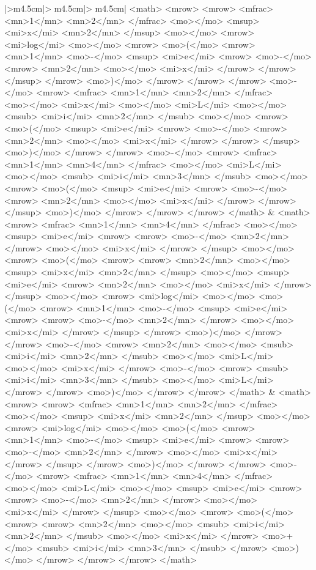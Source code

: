 \begin{longtable}{|>{\centering\arraybackslash}m{4.5cm}|>
{\centering\arraybackslash}m{4.5cm}|>
{\centering\arraybackslash}m{4.5cm}|}
\scriptsize{\codefont <math> <mrow> <mrow> <mfrac> <mn>1</mn> <mn>2</mn> </mfrac> <mo>⁢</mo> <msup> <mi>x</mi> <mn>2</mn> </msup> <mo>⁢</mo> <mrow> <mi>log</mi> <mo>⁡</mo> <mrow> <mo>(</mo> <mrow> <mn>1</mn> <mo>-</mo> <msup> <mi>e</mi> <mrow> <mo>-</mo> <mrow> <mn>2</mn> <mo>⁢</mo> <mi>x</mi> </mrow> </mrow> </msup> </mrow> <mo>)</mo> </mrow> </mrow> </mrow> <mo>-</mo> <mrow> <mfrac> <mn>1</mn> <mn>2</mn> </mfrac> <mo>⁢</mo> <mi>x</mi> <mo>⁢</mo> <mi>L</mi> <mo>⁢</mo> <msub> <mi>i</mi> <mn>2</mn> </msub> <mo>⁢</mo> <mrow> <mo>(</mo> <msup> <mi>e</mi> <mrow> <mo>-</mo> <mrow> <mn>2</mn> <mo>⁢</mo> <mi>x</mi> </mrow> </mrow> </msup> <mo>)</mo> </mrow> </mrow> <mo>-</mo> <mrow> <mfrac> <mn>1</mn> <mn>4</mn> </mfrac> <mo>⁢</mo> <mi>L</mi> <mo>⁢</mo> <msub> <mi>i</mi> <mn>3</mn> </msub> <mo>⁢</mo> <mrow> <mo>(</mo> <msup> <mi>e</mi> <mrow> <mo>-</mo> <mrow> <mn>2</mn> <mo>⁢</mo> <mi>x</mi> </mrow> </mrow> </msup> <mo>)</mo> </mrow> </mrow> </mrow> </math> }      & \scriptsize{\codefont <math> <mrow> <mfrac> <mn>1</mn> <mn>4</mn> </mfrac> <mo>⁢</mo> <msup> <mi>e</mi> <mrow> <mrow> <mo>-</mo> <mn>2</mn> </mrow> <mo>⁢</mo> <mi>x</mi> </mrow> </msup> <mo>⁢</mo> <mrow> <mo>(</mo> <mrow> <mrow> <mn>2</mn> <mo>⁢</mo> <msup> <mi>x</mi> <mn>2</mn> </msup> <mo>⁢</mo> <msup> <mi>e</mi> <mrow> <mn>2</mn> <mo>⁢</mo> <mi>x</mi> </mrow> </msup> <mo>⁢</mo> <mrow> <mi>log</mi> <mo>⁡</mo> <mo>(</mo> <mrow> <mn>1</mn> <mo>-</mo> <msup> <mi>e</mi> <mrow> <mrow> <mo>-</mo> <mn>2</mn> </mrow> <mo>⁢</mo> <mi>x</mi> </mrow> </msup> </mrow> <mo>)</mo> </mrow> </mrow> <mo>-</mo> <mrow> <mn>2</mn> <mo>⁢</mo> <msub> <mi>i</mi> <mn>2</mn> </msub> <mo>⁢</mo> <mi>L</mi> <mo>⁢</mo> <mi>x</mi> </mrow> <mo>-</mo> <mrow> <msub> <mi>i</mi> <mn>3</mn> </msub> <mo>⁢</mo> <mi>L</mi> </mrow> </mrow> <mo>)</mo> </mrow> </mrow> </math> }    & \scriptsize{\codefont <math> <mrow> <mrow> <mfrac> <mn>1</mn> <mn>2</mn> </mfrac> <mo>⁢</mo> <msup> <mi>x</mi> <mn>2</mn> </msup> <mo>⁢</mo> <mrow> <mi>log</mi> <mo>⁡</mo> <mo>(</mo> <mrow> <mn>1</mn> <mo>-</mo> <msup> <mi>e</mi> <mrow> <mrow> <mo>-</mo> <mn>2</mn> </mrow> <mo>⁢</mo> <mi>x</mi> </mrow> </msup> </mrow> <mo>)</mo> </mrow> </mrow> <mo>-</mo> <mrow> <mfrac> <mn>1</mn> <mn>4</mn> </mfrac> <mo>⁢</mo> <mi>L</mi> <mo>⁢</mo> <msup> <mi>e</mi> <mrow> <mrow> <mo>-</mo> <mn>2</mn> </mrow> <mo>⁢</mo> <mi>x</mi> </mrow> </msup> <mo>⁢</mo> <mrow> <mo>(</mo> <mrow> <mrow> <mn>2</mn> <mo>⁢</mo> <msub> <mi>i</mi> <mn>2</mn> </msub> <mo>⁢</mo> <mi>x</mi> </mrow> <mo>+</mo> <msub> <mi>i</mi> <mn>3</mn> </msub> </mrow> <mo>)</mo> </mrow> </mrow> </mrow> </math>}     \\ 

\end{longtable}
